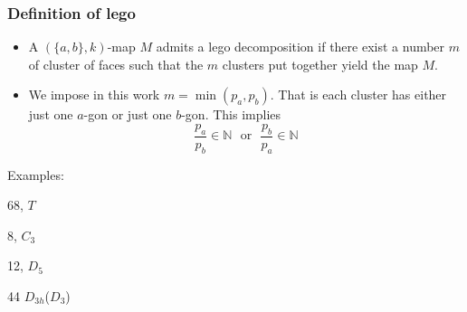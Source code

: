 \documentclass{beamer}
\newcommand{\NN}{\ensuremath{\mathbb{N}}}
\begin{document}
  
\begin{frame}
\frametitle{Definition of lego}

\begin{itemize}
\item A $(\{a,b\},k)$-map $M$ admits a lego decomposition if there exist a number $m$ of cluster of faces
  such that the $m$ clusters put together yield the map $M$.
\item We impose in this work $m=\min(p_a, p_b)$. That is each cluster has either just one $a$-gon or just one $b$-gon. This implies
  \begin{equation*}
  \frac{p_a}{p_b}\in \NN \mbox{~~or~~}\frac{p_b}{p_a}\in \NN
  \end{equation*}
\end{itemize}
Examples:
\begin{center}
\begin{minipage}[b]{2.5cm}\centering
{}\par
$68$, $T$
\end{minipage}
\begin{minipage}[b]{2.7cm}\centering
{}\par
8, $C_3$
\end{minipage}
\begin{minipage}[b]{2.6cm}\centering
{}\par
12, $D_5$
\end{minipage}
\begin{minipage}[b]{2.5cm}\centering
{}\par
44 $D_{3h}$($D_3$)
\end{minipage}

\end{center}



\end{frame}
\end{document}
